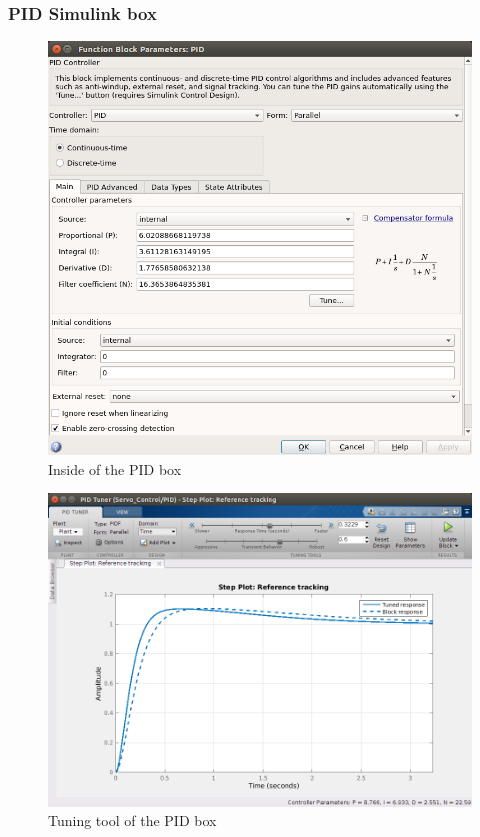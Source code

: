   
\subsubsection{PID Simulink box}


\begin{figure}[H]
\centering
\includegraphics[scale=0.4]{figures/PID_window.png}
\caption{Inside of the PID box}
\label{dcmotor_circuit}
\end{figure}


\begin{figure}[H]
\centering
\includegraphics[scale=0.4]{figures/PID_param.png}
\caption{Tuning tool of the PID box}
\label{dcmotor_circuit}
\end{figure}
  


